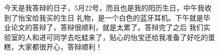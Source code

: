 \documentclass[cn,11pt,chinese]{elegantbook}
\begin{document}
\begin{figure}
    \caption{今天是我答辩的日子，5月22号，而且也是我的阳历生日，中午我收到了怡宝给我买的生日
    礼物，是一个白色的蓝牙耳机。下午就是毕业论文的答辩了，答辩很顺利，就是太累了。答辩完了之后
    我们实验室的人和进可同学去吃蛙来了，贴心的怡宝还给我准备了好吃的蛋糕，大家都很开心，答辩顺利！}
\end{figure}
\end{document}
